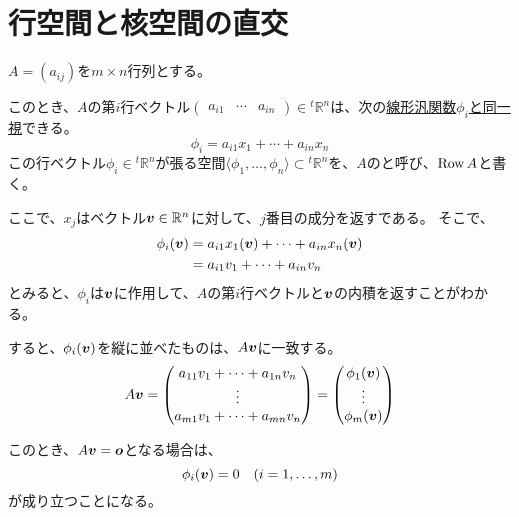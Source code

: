 \documentclass[../../../topic_linear-algebra]{subfiles}
\begin{document}
\sectionline
\section{行空間と核空間の直交}

$A = (a_{ij})$を$m \times n$行列とする。

このとき、$A$の第$i$行ベクトル$\begin{pmatrix} a_{i1} & \cdots & a_{in} \end{pmatrix} \in {}^t\mathbb{R}^n$は、次の\hyperref[sec:row-vector-functional]{線形汎関数$\phi_i$と同一視}できる。
\begin{equation*}
  \phi_i = a_{i1} x_1 + \cdots + a_{in} x_n
\end{equation*}
この行ベクトル$\phi_i \in {}^t\mathbb{R}^n$が張る空間$\langle \phi_1, \ldots, \phi_n \rangle \subset {}^t\mathbb{R}^n$を、$A$のと呼び、$\operatorname{Row} A$と書く。

\br

ここで、$x_j$はベクトル$\vb*{v} \in \mathbb{R}^n$に対して、$j$番目の成分を返すである。
そこで、
\begin{align*}
  \phi_i(\vb*{v}) &= a_{i1} x_1(\vb*{v}) + \cdots + a_{in} x_n(\vb*{v}) \\
  &= a_{i1} v_1 + \cdots + a_{in} v_n
\end{align*}
とみると、$\phi_i$は$\vb*{v}$に作用して、$A$の第$i$行ベクトルと$\vb*{v}$の内積を返すことがわかる。

\br

すると、$\phi_i(\vb*{v})$を縦に並べたものは、$A\vb*{v}$に一致する。
\begin{equation*}
  A\vb*{v} = \begin{pmatrix}
    a_{11} v_1 + \cdots + a_{1n} v_n \\
    \vdots \\
    a_{m1} v_1 + \cdots + a_{mn} v_n
  \end{pmatrix} = \begin{pmatrix}
    \phi_1(\vb*{v}) \\
    \vdots \\
    \phi_m(\vb*{v})
  \end{pmatrix}
\end{equation*}

\br

このとき、$A\vb*{v} = \vb*{o}$となる場合は、
\begin{equation*}
  \phi_i(\vb*{v}) = 0 \quad (i = 1, \ldots, m)
\end{equation*}
が成り立つことになる。
\end{document}
